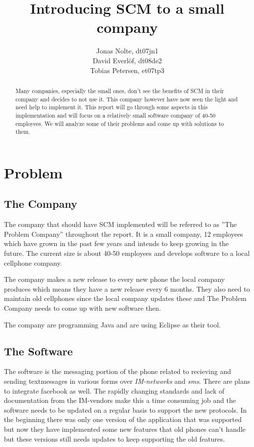 \documentclass[a4paper,10pt]{article}
\title{Introducing SCM to a small company}
\author{Jonas Nolte, dt07jn1\\
David Everlöf, dt08de2\\
Tobias Petersen, et07tp3}
\begin{document}
\maketitle

\begin{abstract}

Many companies, especially the small ones, don't see the benefits of SCM in their company and decides to not use it.
This company however have now seen the light and need help to implement it.
This report will go through some aspects in this implementation and will focus on a relatively small software company of 40-50 employees.
We will analyze some of their problems and come up with solutions to them.


\end{abstract}

\section{Problem}

\subsection{The Company}

The company that should have SCM implemented will be referred to as ''The Problem Company'' throughout the report.
It is a small company, 12 employees which have grown in the past few years and intends to keep growing in the future. The current size is about 40-50 employees and develops software to a local cellphone company.

The company makes a new release to every new phone the local company produces which means they have a new release every 6 months.
They also need to maintain old cellphones since the local company updates these and The Problem Company needs to come up with new software then.

The company are programming Java and are using Eclipse as their tool.

\subsection{The Software}

The software is the messaging portion of the phone related to recieving and sending textmessages in various forms over \emph{IM-networks} and  \emph{sms}. There are plans to integrate facebook as well.
The rapidly changing standards and lack of documentation from the IM-vendors make this a time consuming job and the software needs to be updated on a regular basis to support the new protocols.
In the beginning there was only one version of the application that was supported but now they have implemented some new features that old phones can't handle but these versions still needs updates to keep supporting the old features.
\end{document}
